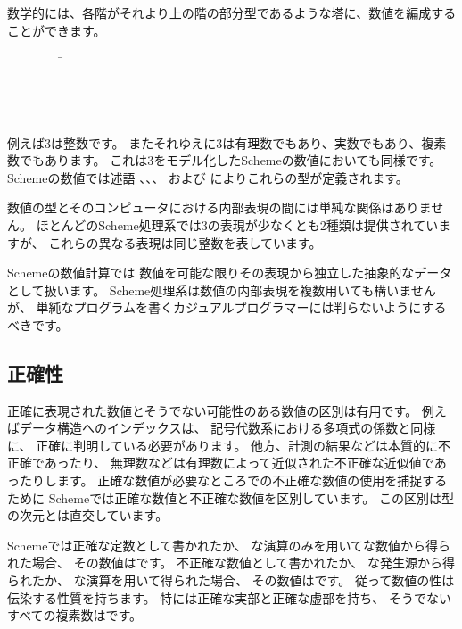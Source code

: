 \vest 数学的には、各階がそれより上の階の部分型であるような塔に、数値を編成することができます。
\begin{tabbing}
\ \ \ \ \ \ \ \ \ \= \\
\>  \\
\>  \\
\>  \\
\>  
\end{tabbing}

例えば3は整数です。
またそれゆえに3は有理数でもあり、実数でもあり、複素数でもあります。
これは3をモデル化したSchemeの数値においても同様です。
Schemeの数値では述語
、、、 および 
によりこれらの型が定義されます。

数値の型とそのコンピュータにおける内部表現の間には単純な関係はありません。
ほとんどのScheme処理系では3の表現が少なくとも2種類は提供されていますが、
これらの異なる表現は同じ整数を表しています。

Schemeの数値計算では
数値を可能な限りその表現から独立した抽象的なデータとして扱います。
Scheme処理系は数値の内部表現を複数用いても構いませんが、
単純なプログラムを書くカジュアルプログラマーには判らないようにするべきです。

\subsection{正確性}

 \label{exactly}

正確に表現された数値とそうでない可能性のある数値の区別は有用です。
例えばデータ構造へのインデックスは、
記号代数系における多項式の係数と同様に、
正確に判明している必要があります。
他方、計測の結果などは本質的に不正確であったり、
無理数などは有理数によって近似された不正確な近似値であったりします。
正確な数値が必要なところでの不正確な数値の使用を捕捉するために
Schemeでは正確な数値と不正確な数値を区別しています。
この区別は型の次元とは直交しています。

Schemeでは正確な定数として書かれたか、
な演算のみを用いてな数値から得られた場合、
その数値はです。
不正確な数値として書かれたか、
な発生源から得られたか、
な演算を用いて得られた場合、
その数値はです。
従って数値の性は伝染する性質を持ちます。
特には正確な実部と正確な虚部を持ち、
そうでないすべての複素数はです。

